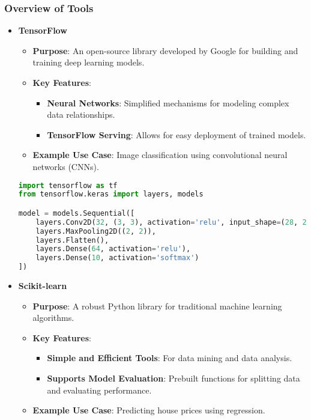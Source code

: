 \documentclass[aspectratio=169]{beamer}
\begin{document}
\begin{frame}[fragile]
    \frametitle{Overview of Tools}
    \begin{itemize}
        \item \textbf{TensorFlow}
        \begin{itemize}
            \item \textbf{Purpose}: An open-source library developed by Google for building and training deep learning models.
            \item \textbf{Key Features}:
            \begin{itemize}
                \item \textbf{Neural Networks}: Simplified mechanisms for modeling complex data relationships.
                \item \textbf{TensorFlow Serving}: Allows for easy deployment of trained models.
            \end{itemize}
            \item \textbf{Example Use Case}: Image classification using convolutional neural networks (CNNs).
        \end{itemize}
        
        \begin{lstlisting}[language=Python]
import tensorflow as tf
from tensorflow.keras import layers, models

model = models.Sequential([
    layers.Conv2D(32, (3, 3), activation='relu', input_shape=(28, 28, 1)),
    layers.MaxPooling2D((2, 2)),
    layers.Flatten(),
    layers.Dense(64, activation='relu'),
    layers.Dense(10, activation='softmax')
])
        \end{lstlisting}

        \item \textbf{Scikit-learn}
        \begin{itemize}
            \item \textbf{Purpose}: A robust Python library for traditional machine learning algorithms.
            \item \textbf{Key Features}:
            \begin{itemize}
                \item \textbf{Simple and Efficient Tools}: For data mining and data analysis.
                \item \textbf{Supports Model Evaluation}: Prebuilt functions for splitting data and evaluating performance.
            \end{itemize}
            \item \textbf{Example Use Case}: Predicting house prices using regression.
        \end{itemize}
        

\end{itemize}
\end{frame}
\end{document}
